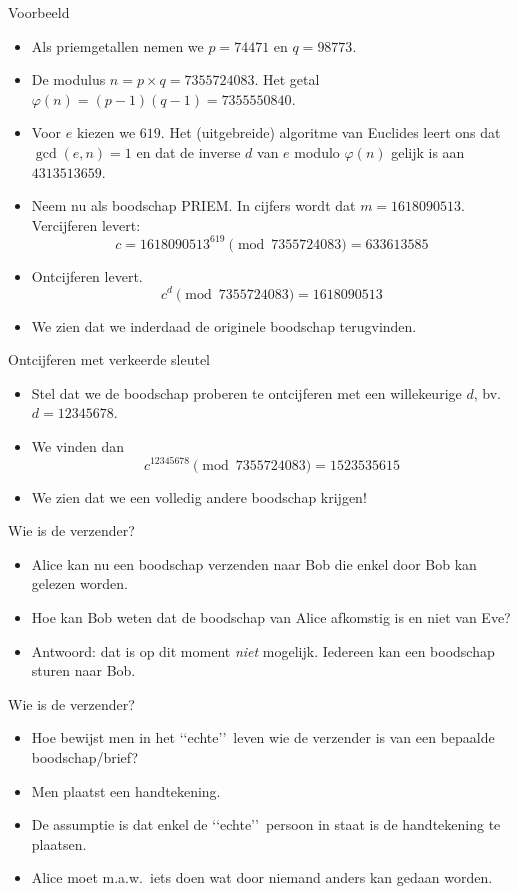 \documentclass{beamer}
\begin{document}
\begin{frame}{Voorbeeld}
\begin{itemize}
	 \pause\item Als priemgetallen nemen we $p = 74471$ en $q = 98773$. 
	 \pause\item De modulus $n = p \times q = 7355724083$.  Het getal $\varphi(n) = (p - 1)(q - 1) = 7355550840$.
	 \pause\item
	 Voor $e$ kiezen we $619$. Het (uitgebreide) algoritme van Euclides leert ons dat $\gcd(e,n) = 1$  en dat de inverse $d$ van $e$ modulo $\varphi(n)$ gelijk is aan $4313513659$.
	 \pause\item 
	  Neem nu als boodschap PRIEM. In cijfers wordt dat $m = 1618090513$. Vercijferen levert:
	  \[
	  c = 1618090513^{619} \pmod{7355724083} = 633613585
	  \]
	  \pause \item  Ontcijferen levert.
	  \[
	  c^d  \pmod{7355724083} = 1618090513
	  \]
	  \pause\item  We zien dat we inderdaad de originele boodschap terugvinden.
	  \end{itemize}
\end{frame}

\begin{frame}{Ontcijferen met verkeerde sleutel}
\begin{itemize}
	\item Stel dat we de boodschap proberen te ontcijferen met een willekeurige $d$, bv.\ $d = 12345678$.
	\item We vinden dan
	\[
	c^{12345678} \pmod{7355724083} = 1523535615
	\]
	\item We zien dat we een volledig andere boodschap krijgen!
\end{itemize}
\end{frame}


\begin{frame}{Wie is de verzender?}
\begin{itemize}
	\item Alice kan nu een boodschap verzenden naar Bob die enkel door Bob
	kan gelezen worden.
	\item Hoe kan Bob weten dat de boodschap van Alice afkomstig is 
	en niet van Eve?
	\pause \item Antwoord: dat is op dit moment \emph{niet}\/ mogelijk. Iedereen 
	kan een boodschap sturen naar Bob.
\end{itemize}
\end{frame}

\begin{frame}{Wie is de verzender?}
\begin{itemize}
	\item Hoe bewijst men in het \lq\lq echte\rq\rq\ leven wie de verzender is
	van een bepaalde boodschap/brief?
	\pause \item Men plaatst een handtekening.
	\pause \item De assumptie is dat enkel de \lq\lq echte\rq\rq\ persoon 
	in staat is de handtekening te plaatsen.
	\pause \item Alice moet m.a.w.\ iets doen wat door niemand anders kan 
	gedaan worden.
\end{itemize}	
\end{frame}
\end{document}
